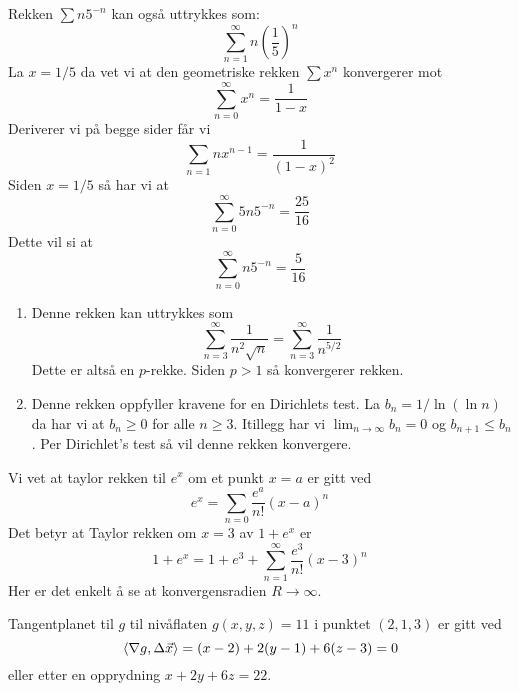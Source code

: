 \oppgave
\deloppgave
Rekken $\sum n5^{-n}$ kan også uttrykkes som:
$$
\sum_{n = 1}^\infty n\left(\frac{1}{5}\right)^n
$$
La $x = 1/5$ da vet vi at den geometriske rekken $\sum x^n$ konvergerer mot
$$
\sum_{n = 0}^\infty x^n = \frac{1}{1-x}
$$
Deriverer vi på begge sider får vi
$$
\sum_{n = 1} nx^{n-1} = \frac{1}{(1-x)^2}
$$
Siden $x = 1/5$ så har vi at
$$
\sum_{n = 0}^\infty 5n5^{-n} = \frac{25}{16}
$$
Dette vil si at 
$$
\sum_{n = 0}^\infty n5^{-n} = \frac{5}{16}
$$

\begin{enumerate}
	\item Denne rekken kan uttrykkes som
	$$
	\sum_{n = 3}^\infty \frac{1}{n^2\sqrt{n}} = \sum_{n = 3}^\infty \frac{1}{n^{5/2}}
	$$
	Dette er altså en $p$-rekke. Siden $p > 1$ så konvergerer rekken.
	
	\item Denne rekken oppfyller kravene for en Dirichlets test. La $b_n = 1/\ln(\ln n)$ da har vi at $b_n \geq 0$ for alle $n \geq 3$. Itillegg har vi $\lim_{n \to \infty} b_n = 0$ og $b_{n+1} \leq b_n$. Per Dirichlet's test så vil denne rekken konvergere.
\end{enumerate}

\deloppgave
Vi vet at taylor rekken til $e^x$ om et punkt $x = a$ er gitt ved
$$
e^{x} = \sum_{n = 0}\frac{e^a}{n!}(x - a)^n
$$
Det betyr at Taylor rekken om $x = 3$ av $1 + e^x$ er
$$
1 + e^x = 1 + e^3 + \sum_{n = 1}^\infty \frac{e^3}{n!}(x - 3)^n
$$
Her er det enkelt å se at konvergensradien $R \to \infty$.

\oppgave
Tangentplanet til $g$ til nivåflaten $g(x, y, z) = 11$ i punktet $(2, 1, 3)$ er gitt ved
$$
\,\left\langle \nabla g, \Delta \vec{x}\right\rangle = (x - 2) + 2(y - 1) + 6(z - 3) = 0
$$
eller etter en opprydning $x + 2y + 6z = 22$.

\clearpage